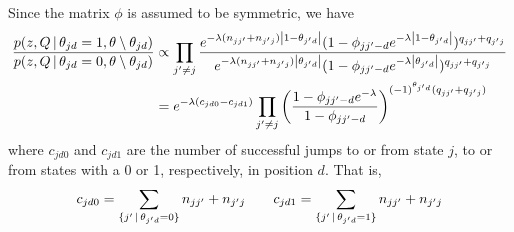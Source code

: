 Since the matrix $\phi$ is assumed to be symmetric, we have
\begin{align}
  \label{eq:70}
  \frac{p(z, Q \, \vert \, \theta_{jd}  = 1, \theta\setminus\theta_{jd}
    )}{p(z, Q \, \vert \, \theta_{jd}  = 0, \theta\setminus\theta_{jd} )}
  &\propto \prod_{j' \neq j}
  \frac{e^{-\lambda(n_{jj'} + n_{j'j})\left\vert 1 - \theta_{j'd} \right\vert}(1 -
    \phi_{jj'-d} e^{-\lambda\left\vert 1 - \theta_{j'd} \right\vert})^{q_{jj'} +
      q_{j'j}}}{e^{-\lambda(n_{jj'} + n_{j'j})\left\vert \theta_{j'd} \right\vert}
    (1-\phi_{jj'-d}e^{-\lambda\left\vert \theta_{j'd} \right\vert})^{q_{jj'} +
      q_{j'j}}} \\
  &= \label{eq:71} e^{-\lambda(c_{jd0} - c_{jd1})}
  \prod_{j' \neq j} \left(\frac{1 - \phi_{jj'-d}e^{-\lambda}}{1-\phi_{jj'-d}}\right)^{(-1)^{\theta_{j'd}}(q_{jj'} + q_{j'j})}
\end{align}
where $c_{jd0}$ and $c_{jd1}$ are the number of successful jumps to or
from state $j$, to or from states with a 0 or 1, respectively, in
position $d$.  That is,
\begin{equation}
  \label{eq:72}
  c_{jd0} = \sum_{\{j' \, \vert \, \theta_{j'd} = 0\}} n_{jj'} + n_{j'j}\qquad c_{jd1} = \sum_{\{j' \, \vert \, \theta_{j'd} = 1\}} n_{jj'} + n_{j'j}
\end{equation}

